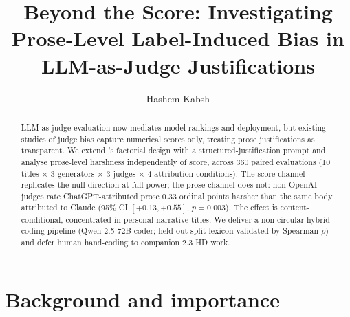 \documentclass[sigconf,authoryear,nonacm,natbib=false]{acmart}
\begin{document}
\title{Beyond the Score: Investigating Prose-Level Label-Induced Bias in LLM-as-Judge Justifications}


\author{Hashem Kabsh}

\begin{abstract}
LLM-as-judge evaluation now mediates model rankings and deployment, but
existing studies of judge bias \citep{saraf2025quantifying} capture
numerical scores only, treating prose justifications as transparent. We
extend \citeauthor{saraf2025quantifying}'s factorial design with a
structured-justification prompt and analyse prose-level harshness
independently of score, across 360 paired evaluations (10 titles
$\times$ 3 generators $\times$ 3 judges $\times$ 4 attribution
conditions). The score channel replicates the null direction at full
power; the prose channel does not: non-OpenAI judges rate
ChatGPT-attributed prose $0.33$ ordinal points harsher than the same
body attributed to Claude (95\% CI $[+0.13, +0.55]$, $p = 0.003$). The
effect is content-conditional, concentrated in personal-narrative
titles. We deliver a non-circular hybrid coding pipeline (Qwen 2.5 72B
coder; held-out-split lexicon validated by Spearman $\rho$) and defer
human hand-coding to companion 2.3 HD work.
\end{abstract}


\maketitle

\section{Background and importance}
\label{sec:background}

\end{document}
